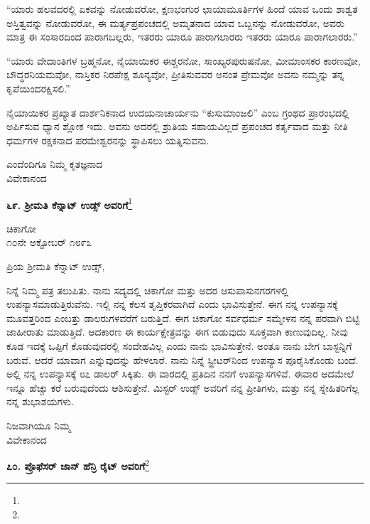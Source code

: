 “ಯಾರು ಹಲವದರಲ್ಲಿ ಏಕವನ್ನು ನೋಡುವರೋ, ಕ್ಷಣಭಂಗುರ ಛಾಯಾಮೂರ್ತಿ\break ಗಳ ಹಿಂದೆ ಯಾವ ಒಂದು ಶಾಶ್ವತ ಅಸ್ತಿತ್ವವನ್ನು ನೋಡುವರೋ, ಈ ಮರ್ತ್ಯಪ್ರಪಂಚದಲ್ಲಿ ಅಮೃತನಾದ ಯಾವ ಒಬ್ಬನನ್ನು ನೋಡುವರೋ, ಅವರು ಮಾತ್ರ ಈ ಸಂಸಾರದಿಂದ ಪಾರಾಗಬಲ್ಲರು, ಇತರರು ಯಾರೂ ಪಾರಾಗಲಾರರು\enginline{-} ಇತರರು ಯಾರೂ ಪಾರಾಗಲಾರರು.''

“ಯಾರು ವೇದಾಂತಿಗಳ ಬ್ರಹ್ಮನೋ, ನೈಯಾಯಿಕರ ಈಶ್ಚರನೋ, ಸಾಂಖ್ಯರ\break ಪುರುಷನೋ, ಮೀಮಾಂಸಕರ ಕಾರಣವೋ, ಬೌದ್ಧರನಿಯಮವೋ, ನಾಸ್ತಿಕರ ನಿರಪೇಕ್ಷ ಶೂನ್ಯವೋ, ಪ್ರೀತಿಸುವವರ ಅನಂತ ಪ್ರೇಮವೋ ಅವನು ನಮ್ಮನ್ನು ತನ್ನ ಕೃಪೆಯಿಂದ\break ರಕ್ಷಿಸಲಿ.”

ನೈಯಾಯಿಕರ ಪ್ರಖ್ಯಾತ ದಾರ್ಶನಿಕನಾದ ಉದಯನಾಚಾರ್ಯನು ``ಕುಸುಮಾಂಜಲಿ'' ಎಂಬ ಗ್ರಂಥದ ಪ್ರಾರಂಭದಲ್ಲಿ ಅರ್ಪಿಸುವ ಧ್ಯಾನ ಶ್ಲೋಕ ಇದು. ಅವನು ಅದರಲ್ಲಿ ಶ್ರುತಿಯ ಸಹಾಯವಿಲ್ಲದೆ ಪ್ರಪಂಚದ ಕರ್ತೃವಾದ ಮತ್ತು ನೀತಿ ಧರ್ಮಗಳ ರಕ್ಷಕನಾದ ಪರಮೇಶ್ವರನನ್ನು ಸ್ಥಾಪಿಸಲು ಯತ್ನಿಸುವನು.

{\flushright
ಎಂದೆಂದಿಗೂ ನಿಮ್ಮ ಕೃತಜ್ಞನಾದ\\ವಿವೇಕಾನಂದ\par}

\begin{center}
\textbf{೬೯. ಶ‍್ರೀಮತಿ ಕೆನ್ನಾಟ್ ಉಡ್ಸ್ ಅವರಿಗೆ}\footnote{}
\end{center}

\begin{flushright}
ಚಿಕಾಗೋ\\೧೦ನೇ ಅಕ್ಟೋಬರ್ ೧೮೯೩
\end{flushright}

\noindent
ಪ್ರಿಯ ಶ‍್ರೀಮತಿ ಕೆನ್ನಾಟ್ ಉಡ್ಸ್,

ನಿನ್ನೆ ನಿಮ್ಮ ಪತ್ರ ತಲುಪಿತು. ನಾನು ಸದ್ಯದಲ್ಲಿ ಚಿಕಾಗೋ ಮತ್ತು ಅದರ ಆಸುಪಾಸುನಗರಗಳಲ್ಲಿ ಉಪನ್ಯಾಸಮಾಡುತ್ತಿರುವೆನು. ಇಲ್ಲಿ ನನ್ನ ಕೆಲಸ ತೃಪ್ತಿಕರವಾಗಿದೆ ಎಂದು ಭಾವಿಸುತ್ತೇನೆ. ಈಗ ನನ್ನ ಉಪನ್ಯಾಸಕ್ಕೆ ಮೂವತ್ತರಿಂದ ಎಂಬತ್ತು ಡಾಲರುಗಳವರೆಗೆ ಬರುತ್ತಿದೆ. ಈಗ ಚಿಕಾಗೋ ಸರ್ವಧರ್ಮ ಸಮ್ಮೇಳನ ನನ್ನ ಪರವಾಗಿ ಬಿಟ್ಟಿ ಜಾಹೀರಾತು ಮಾಡುತ್ತಿದೆ. ಆದಕಾರಣ ಈ ಕಾರ್ಯಕ್ಷೇತ್ರವನ್ನು ಈಗ ಬಿಡುವುದು ಸೂಕ್ತವಾಗಿ ಕಾಣುವುದಿಲ್ಲ. ನೀವು ಕೂಡ ಇದಕ್ಕೆ ಒಪ್ಪಿಗೆ ಕೊಡುವುದರಲ್ಲಿ ಸಂದೇಹವಿಲ್ಲ ಎಂದು ನಾನು ಭಾವಿಸುತ್ತೇನೆ. ಅಂತೂ ನಾನು ಬೇಗ ಬಾಸ್ಟನ್ನಿಗೆ ಬರುವೆ. ಆದರೆ ಯಾವಾಗ ಎನ್ನುವುದನ್ನು ಹೇಳಲಾರೆ. ನಾನು ನಿನ್ನೆ ಸ್ಟ್ರೀಟರ್‌ನಿಂದ ಉಪನ್ಯಾಸ ಪೂರೈಸಿಕೊಂಡು ಬಂದೆ. ಅಲ್ಲಿ ನನ್ನ ಉಪನ್ಯಾಸಕ್ಕೆ ೮೭ ಡಾಲರ್ ಸಿಕ್ಕಿತು. ಈ ವಾರದಲ್ಲಿ ಪ್ರತಿದಿನ ನನಗೆ ಉಪನ್ಯಾಸಗಳಿವೆ. ಈವಾರ ಆದಮೇಲೆ ಇನ್ನೂ ಹೆಚ್ಚು ಕರೆ ಬರುವುದೆಂದು ಆಶಿಸುತ್ತೇನೆ. ಮಿಸ್ಟರ್ ಉಡ್ಸ್ ಅವರಿಗೆ ನನ್ನ ಪ್ರೀತಿಗಳು, ಮತ್ತು ನನ್ನ ಸ್ನೇಹಿತರಿಗೆಲ್ಲ ನನ್ನ ಶುಭಾಶಯಗಳು.

{\flushright
ನಿಜವಾಗಿಯೂ ನಿಮ್ಮ\\ವಿವೇಕಾನಂದ\par}

\begin{center}
\textbf{೭೦. ಪ್ರೊಫೆಸರ್ ಜಾನ್ ಹೆನ್ರಿ ರೈಟ್ ಅವರಿಗೆ}\footnote{}
\end{center}

